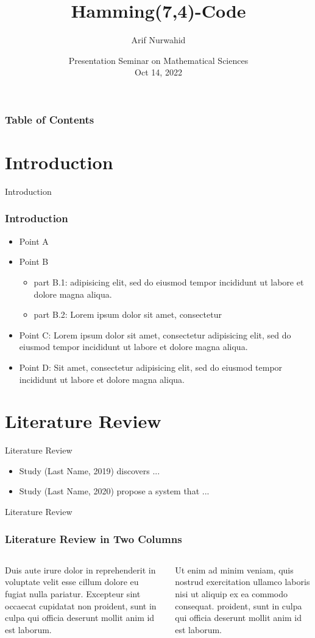 \documentclass[10pt]{beamer}
\title[Hamming(7,4)-Code]{Hamming(7,4)-Code}
\author[Arif Nurwahid]{Arif Nurwahid\inst{1}}%
\institute[愛媛大学]{Graduate School of Science and Engineering, Ehime University\inst{1}}
\date[\textcolor{ehimeColor2}{Mathematical Science, 2022}]
{Presentation Seminar on Mathematical Sciences\\
Oct 14, 2022}
\begin{document}
\frame{\titlepage}
\begin{frame}
\frametitle{Table of Contents}
\tableofcontents
\end{frame}

\section{Introduction}
    \begin{frame}{Introduction}
    \frametitle{Introduction}
        \begin{itemize}
            \item Point A
            \item Point B
        \begin{itemize}
            \item part B.1: adipisicing elit, sed do eiusmod tempor incididunt ut labore et dolore magna aliqua.
            \item part B.2: Lorem ipsum dolor sit amet, consectetur 
        \end{itemize}
            \item Point C: Lorem ipsum dolor sit amet, consectetur adipisicing elit, sed do eiusmod tempor incididunt ut labore et dolore magna aliqua.
            \item Point D: Sit amet, consectetur adipisicing elit, sed do eiusmod tempor incididunt ut labore et dolore magna aliqua.
        \end{itemize}
    \end{frame}
\section{Literature Review}

\begin{frame}{Literature Review}
    
	
    \begin{itemize}
        \item  Study (Last Name, 2019) discovers ...
        \item  Study (Last Name, 2020) propose a system that ...
    \end{itemize}
\end{frame}

\begin{frame}{Literature Review}
    \frametitle{Literature Review in Two Columns}
    \begin{columns}
    
    Duis aute irure dolor in reprehenderit in voluptate velit esse cillum dolore eu fugiat nulla pariatur. Excepteur sint occaecat cupidatat non proident, sunt in culpa qui officia deserunt mollit anim id est laborum.
    
    Ut enim ad minim veniam, quis nostrud exercitation ullamco laboris nisi ut aliquip ex ea commodo consequat. proident, sunt in culpa qui officia deserunt mollit anim id est laborum.
    
    \end{columns}
\end{frame}
\end{document}

